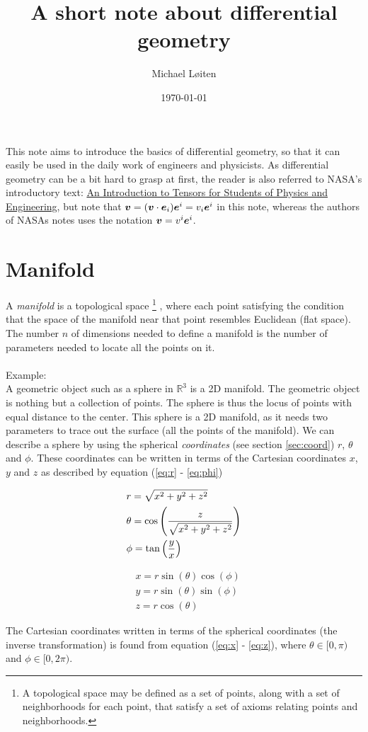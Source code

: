 \documentclass[a4paper, 12pt]{article}
\title{\vspace{-8ex}A short note about differential geometry\vspace{-1ex}}
\author{Michael L{\o}iten}
\date{\vspace{-2ex}\today}
\def\NASAintro{http://www.grc.nasa.gov/WWW/k-12/Numbers/Math/documents/Tensors_TM2002211716.pdf}
\begin{document}
\maketitle

This note aims to introduce the basics of differential geometry, so that it can
easily be used in the daily work of engineers and physicists. As differential
geometry can be a bit hard to grasp at first, the reader is also referred to
NASA's introductory text:
\href{\NASAintro
}{An Introduction to Tensors for Students of Physics and Engineering}, but note
that $\boldsymbol{v}=(\boldsymbol{v}\cdot\boldsymbol{e}_i)\boldsymbol{e}^i = v_i\boldsymbol{e}^i$ in this note, whereas
the authors of NASAs notes uses the notation $\boldsymbol{v}=v^i\boldsymbol{e}^i$.


\section{Manifold}
A \emph{manifold} is a topological space%
\footnote{A topological space may be defined as a set of points, along with a
          set of neighborhoods for each point, that satisfy a set of axioms
          relating points and neighborhoods.}%
, where each point satisfying the condition that the space of the manifold near
that point resembles Euclidean (flat space). The number $n$ of dimensions needed
to define a manifold is the number of parameters needed to locate all the points
on it.\\
\\
Example:\\
A geometric object such as a sphere in $\mathbb{R}^3$ is a 2D manifold. The
geometric object is nothing but a collection of points. The sphere is thus the
locus of points with equal distance to the center. This sphere is a 2D
manifold, as it needs two parameters to trace out the surface (all the points of
the manifold). We can describe a sphere by using the spherical
\emph{coordinates} (see section \ref{sec:coord}) $r$, $\theta$ and $\phi$. These
coordinates can be written in terms of the Cartesian coordinates $x$, $y$ and
$z$ as described by equation (\ref{eq:r} - \ref{eq:phi})

\begin{minipage}{0.49\textwidth}
 \begin{align}
 &r = \sqrt{x^2+y^2+z^2} \label{eq:r}\\
 &\theta = \cos\left(\frac{z}{\sqrt{x^2+y^2+z^2}}\right) \label{eq:theta}\\
 &\phi = \tan\left(\frac{y}{x}\right) \label{eq:phi}
 \end{align}
\end{minipage}
\begin{minipage}{0.49\textwidth}
 \begin{align}
 &x = r\sin(\theta)\cos(\phi) \label{eq:x}\\
 &y = r\sin(\theta)\sin(\phi) \label{eq:y}\\
 &z = r\cos(\theta) \label{eq:z}
 \end{align}
\end{minipage}
%
The Cartesian coordinates written in terms of the spherical coordinates (the
inverse transformation) is found from equation (\ref{eq:x} - \ref{eq:z}),
where $\theta \in [0,\pi)$ and $\phi \in [0,2\pi)$.
\end{document}
